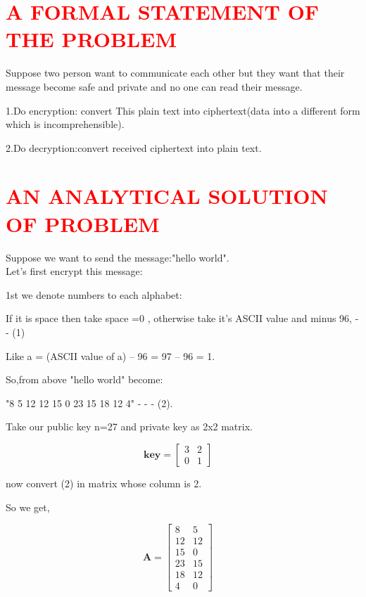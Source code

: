 \documentclass[12pt]{article}
\begin{document}
\section{\textcolor{red}{ A FORMAL STATEMENT OF THE PROBLEM \cite{1} }}
\hspace{1 cm}
        Suppose two person want to communicate each other but they want that their message become safe and private and no one can read their message.
        
        1.Do encryption: convert This plain text into ciphertext(data into a different form which is incomprehensible).
        
         2.Do decryption:convert received ciphertext into plain text.
\section{\textcolor{red}{AN ANALYTICAL SOLUTION OF PROBLEM}}
\hspace{1 cm}
    Suppose we want to send the message:"hello world".\\
    
    Let's first encrypt this message:
    
    1st we denote numbers to each alphabet:
    
        If it is space then take space =0 , otherwise take it’s ASCII value and minus 96, - - (1)
        
    Like a = (ASCII value of a) – 96 = 97 – 96 = 1. 
    
    
    So,from above "hello world" become:
 
    \begin{center}"8 5 12 12 15 0 23 15 18 12 4" - - -  (2).
    \end{center}
    
    Take our public key n=27 and private key as 2x2 matrix.
    
    $$\textbf{key} = 
    \begin{bmatrix}
        3 & 2 \\
        0 & 1 
    \end{bmatrix}
    \quad
    $$
    
    now  convert (2) in matrix whose column is 2.
    
    So we get,
    
    $$\textbf{A} =
    \begin{bmatrix}
        8 & 5\\
        12 & 12\\
        15 & 0\\
        23 & 15\\
        18 & 12\\
        4 & 0
    \end{bmatrix}
    \quad
    $$
    
\end{document}
